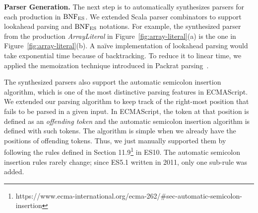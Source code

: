 \smallskip

\textbf{Parser Generation.}
The next step is to automatically synthesizes parsers for each production in \(
\text{BNF}_{\text{ES}} \).  We extended Scala parser combinators to support lookahead parsing
and \( \text{BNF}_{\text{ES}} \) notations. For example, the synthesized parser from the
production \textit{ArrayLiteral} in Figure~\ref{fig:array-literal}(a) is the one
in Figure~\ref{fig:array-literal}(b).  A na\"{i}ve implementation of lookahead
parsing would take exponential time because of backtracking.  To reduce it
to linear time, we applied the memoization technique introduced in
Packrat parsing~\cite{packrat}.  

The synthesized parsers also support the automatic semicolon insertion
algorithm, which is one of the most distinctive parsing features in ECMAScript.
We extended our parsing algorithm to keep track of the right-most position that
fails to be parsed in a given input.  In ECMAScript, the token at that position
is defined as an \textit{offending token} and the automatic semicolon insertion
algorithm is defined with such tokens.  The algorithm is simple when we already
have the positions of offending tokens.  Thus, we just manually supported them
by following the rules defined in Section
11.9\footnote{https://www.ecma-international.org/ecma-262/\#sec-automatic-semicolon-insertion}
in ES10.  The automatic semicolon insertion rules rarely change; since
ES5.1 written in 2011, only one sub-rule was added.
